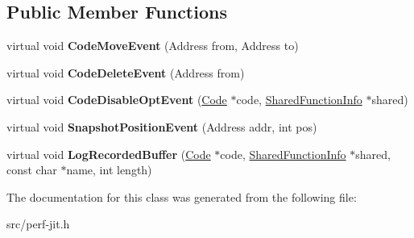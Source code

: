 \subsection*{Public Member Functions}
\begin{DoxyCompactItemize}
\item 
\hypertarget{classv8_1_1internal_1_1_perf_jit_logger_a5a80e497fb9d670756912d43a106f51f}{}virtual void {\bfseries Code\+Move\+Event} (Address from, Address to)\label{classv8_1_1internal_1_1_perf_jit_logger_a5a80e497fb9d670756912d43a106f51f}

\item 
\hypertarget{classv8_1_1internal_1_1_perf_jit_logger_ac8725fa08fd0b252dbe5841e6df0a638}{}virtual void {\bfseries Code\+Delete\+Event} (Address from)\label{classv8_1_1internal_1_1_perf_jit_logger_ac8725fa08fd0b252dbe5841e6df0a638}

\item 
\hypertarget{classv8_1_1internal_1_1_perf_jit_logger_a9f0951faa659302806b7e4576f059969}{}virtual void {\bfseries Code\+Disable\+Opt\+Event} (\hyperlink{classv8_1_1internal_1_1_code}{Code} $\ast$code, \hyperlink{classv8_1_1internal_1_1_shared_function_info}{Shared\+Function\+Info} $\ast$shared)\label{classv8_1_1internal_1_1_perf_jit_logger_a9f0951faa659302806b7e4576f059969}

\item 
\hypertarget{classv8_1_1internal_1_1_perf_jit_logger_a1765d6dd36041cd4698aff5ec6d8ebc5}{}virtual void {\bfseries Snapshot\+Position\+Event} (Address addr, int pos)\label{classv8_1_1internal_1_1_perf_jit_logger_a1765d6dd36041cd4698aff5ec6d8ebc5}

\item 
\hypertarget{classv8_1_1internal_1_1_perf_jit_logger_a019ca1e59d386749640637e647cbf6e7}{}virtual void {\bfseries Log\+Recorded\+Buffer} (\hyperlink{classv8_1_1internal_1_1_code}{Code} $\ast$code, \hyperlink{classv8_1_1internal_1_1_shared_function_info}{Shared\+Function\+Info} $\ast$shared, const char $\ast$name, int length)\label{classv8_1_1internal_1_1_perf_jit_logger_a019ca1e59d386749640637e647cbf6e7}

\end{DoxyCompactItemize}


The documentation for this class was generated from the following file\+:\begin{DoxyCompactItemize}
\item 
src/perf-\/jit.\+h\end{DoxyCompactItemize}
